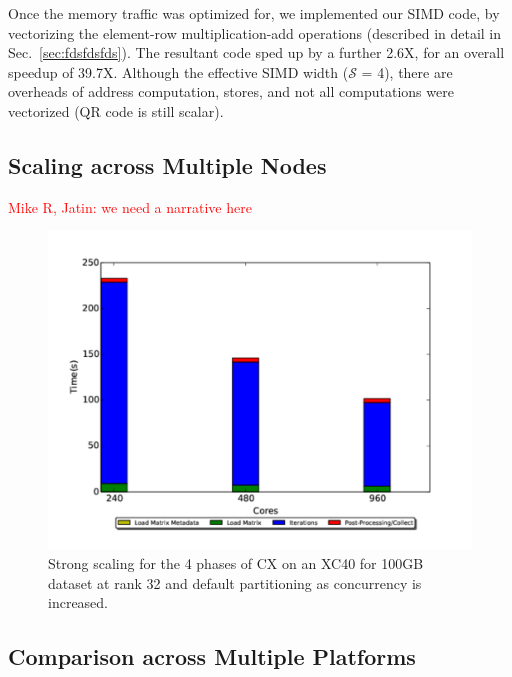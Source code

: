  Once the memory traffic was optimized for, we implemented our 
 SIMD code, by vectorizing the element-row multiplication-add
 operations (described in detail in Sec.~\ref{sec:fdsfdsfds}). 
 The resultant code sped up by a further 2.6X, for an overall
 speedup of 39.7X. Although the effective SIMD width
 ($\mathcal{S}$ = 4), there are overheads of address computation,
 stores, and not all computations were vectorized (QR code is still
 scalar).
 



  \subsection{Scaling across Multiple Nodes}
  \textcolor{red}{Mike R, Jatin: we need a narrative here}
    \begin{figure} [H]
    \begin{centering}
    \includegraphics[scale=0.4]{images/CX_Strong_Scaling_Rank_32_Partitions_default.pdf}
    \end{centering}
    \caption{ Strong scaling for the 4 phases of CX on an XC40 for 100GB dataset at rank 32 and default partitioning as concurrency is increased.} 
    \end{figure} 


  \subsection{Comparison across Multiple Platforms}
    
